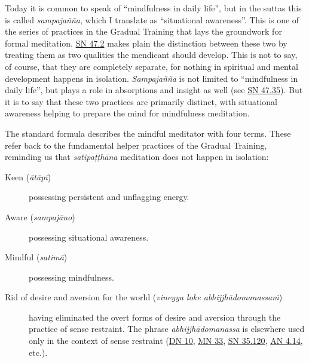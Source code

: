 \documentclass[12pt,openany]{book}%
\begin{document}
Today it is common to speak of “mindfulness in daily life”, but in the suttas this is called \textit{\textsanskrit{sampajañña}}, which I translate as “situational awareness”. This is one of the series of practices in the Gradual Training that lays the groundwork for formal meditation. \href{https://suttacentral.net/sn47.2}{SN 47.2} makes plain the distinction between these two by treating them as two qualities the mendicant should develop. This is not to say, of course, that they are completely separate, for nothing in spiritual and mental development happens in isolation. \textit{\textsanskrit{Sampajañña}} is not limited to “mindfulness in daily life”, but plays a role in absorptions and insight as well (see \href{https://suttacentral.net/sn47.35}{SN 47.35}). But it is to say that these two practices are primarily distinct, with situational awareness helping to prepare the mind for mindfulness meditation.

The standard formula describes the mindful meditator with four terms. These refer back to the fundamental helper practices of the Gradual Training, reminding us that \textit{\textsanskrit{satipaṭṭhāna}} meditation does not happen in isolation:

\begin{description}%
\item[Keen (\textit{\textsanskrit{ātāpī}})] possessing persistent and unflagging energy.%
\item[Aware (\textit{\textsanskrit{sampajāno}})] possessing situational awareness.%
\item[Mindful (\textit{\textsanskrit{satimā}})] possessing mindfulness.%
\item[Rid of desire and aversion for the world (\textit{vineyya loke \textsanskrit{abhijjhādomanassaṁ}})] having eliminated the overt forms of desire and aversion through the practice of sense restraint. The phrase \textit{\textsanskrit{abhijjhādomanassa}} is elsewhere used only in the context of sense restraint (\href{https://suttacentral.net/dn10}{DN 10}, \href{https://suttacentral.net/mn33}{MN 33}, \href{https://suttacentral.net/sn35.120}{SN 35.120}, \href{https://suttacentral.net/an4.14}{AN 4.14}, etc.).%
\end{description}
\end{document}
